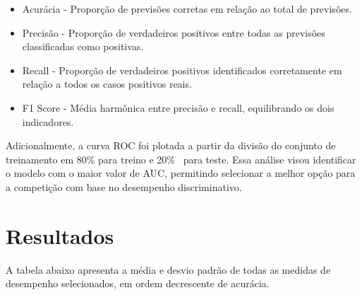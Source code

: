 \documentclass[10pt, conference, compsocconf]{IEEEtran}
\begin{document}
\vspace{0.3cm}

\begin{itemize}
  \item Acurácia - Proporção de previsões corretas em relação ao total de previsões.
  \item Precisão - Proporção de verdadeiros positivos entre todas as previsões classificadas como positivas.
  \item Recall - Proporção de verdadeiros positivos identificados corretamente em relação a todos os casos positivos reais.
  \item F1 Score - Média harmônica entre precisão e recall, equilibrando os dois indicadores.
\end{itemize}

  \vspace{0.3cm}

  Adicionalmente, a curva ROC foi plotada a partir da divisão do conjunto de treinamento em 80\% para treino e 20\% \
  para teste. Essa análise visou identificar o modelo com o maior valor de AUC, permitindo selecionar a melhor opção para a competição 
  com base no desempenho discriminativo.



\section{Resultados}
A tabela abaixo apresenta a média e desvio padrão de todas as medidas de desempenho selecionados, em ordem decrescente de acurácia.
\end{document}
